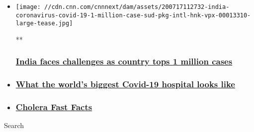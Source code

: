 \begin{itemize}
\item
  \href{/videos/world/2020/07/17/india-coronavirus-covid-19-1-million-case-sud-pkg-intl-hnk-vpx.cnn}{}

  \texttt{[image: //cdn.cnn.com/cnnnext/dam/assets/200717112732-india-coronavirus-covid-19-1-million-case-sud-pkg-intl-hnk-vpx-00013310-large-tease.jpg]}

  **

  \hypertarget{india-faces-challenges-as-country-tops-1-million-cases}{%
  \subsubsection{\texorpdfstring{\href{/videos/world/2020/07/17/india-coronavirus-covid-19-1-million-case-sud-pkg-intl-hnk-vpx.cnn}{India
  faces challenges as country tops 1 million
  cases}}{India faces challenges as country tops 1 million cases}}\label{india-faces-challenges-as-country-tops-1-million-cases}}
\item
  \hypertarget{-what-the-worlds-biggest-covid-19-hospital-looks-like-}{%
  \subsubsection{\texorpdfstring{\href{/videos/world/2020/07/03/india-coronavirus-worlds-biggest-field-hospital-pkg-sud-intl-hnk-vpx.cnn}{
  What the world's biggest Covid-19 hospital looks like
  }}{ What the world's biggest Covid-19 hospital looks like }}\label{-what-the-worlds-biggest-covid-19-hospital-looks-like-}}
\item
  \hypertarget{cholera-fast-facts}{%
  \subsubsection{\texorpdfstring{\href{/2013/10/16/health/cholera-fast-facts/index.html}{Cholera
  Fast Facts}}{Cholera Fast Facts}}\label{cholera-fast-facts}}
\end{itemize}

Search

